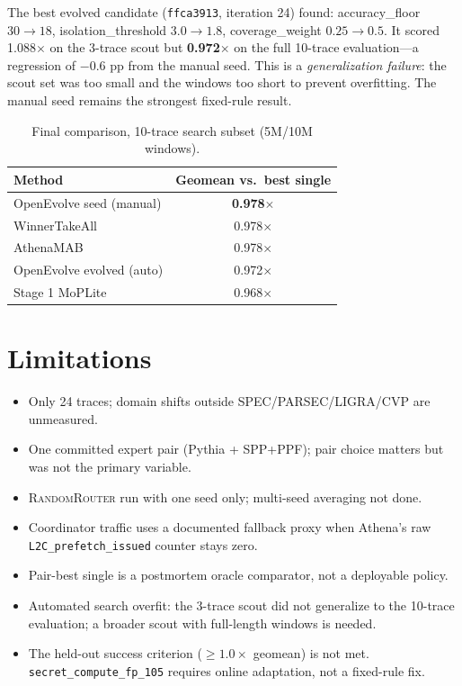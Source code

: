 \documentclass[10pt,twocolumn]{article}
\begin{document}
The best evolved candidate (\texttt{ffca3913}, iteration 24) found:
accuracy\_floor $30 \to 18$, isolation\_threshold $3.0 \to 1.8$,
coverage\_weight $0.25 \to 0.5$. It scored 1.088$\times$ on the 3-trace scout
but \textbf{0.972$\times$} on the full 10-trace evaluation—a regression of
$-$0.6 pp from the manual seed. This is a \textit{generalization failure}:
the scout set was too small and the windows too short to prevent overfitting.
The manual seed remains the strongest fixed-rule result.

\begin{table}[h]
\centering
\caption{Final comparison, 10-trace search subset (5M/10M windows).}
\label{tab:final}
\small
\begin{tabular}{lc}
\toprule
\textbf{Method} & \textbf{Geomean vs.\ best single} \\
\midrule
OpenEvolve seed (manual)     & \textbf{0.978$\times$} \\
WinnerTakeAll                & 0.978$\times$ \\
AthenaMAB                    & 0.978$\times$ \\
OpenEvolve evolved (auto)    & 0.972$\times$ \\
Stage 1 MoPLite              & 0.968$\times$ \\
\bottomrule
\end{tabular}
\end{table}

\section{Limitations}
\label{sec:limitations}

\begin{itemize}
  \item Only 24 traces; domain shifts outside SPEC/PARSEC/LIGRA/CVP are unmeasured.
  \item One committed expert pair (Pythia + SPP+PPF); pair choice matters but was
    not the primary variable.
  \item \textsc{RandomRouter} run with one seed only; multi-seed averaging not done.
  \item Coordinator traffic uses a documented fallback proxy when Athena's raw
    \texttt{L2C\_prefetch\_issued} counter stays zero.
  \item Pair-best single is a postmortem oracle comparator, not a deployable policy.
  \item Automated search overfit: the 3-trace scout did not generalize to the
    10-trace evaluation; a broader scout with full-length windows is needed.
  \item The held-out success criterion ($\geq 1.0\times$ geomean) is not met.
    \texttt{secret\_compute\_fp\_105} requires online adaptation, not a fixed-rule fix.
\end{itemize}
\end{document}
